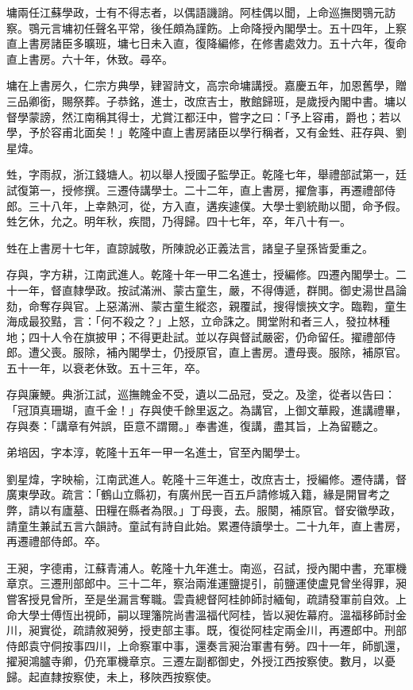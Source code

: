 \begin{pinyinscope}
墉兩任江蘇學政，士有不得志者，以偶語譏誚。阿桂偶以聞，上命巡撫閔鶚元訪察。鶚元言墉初任聲名平常，後任頗為謹飭。上命降授內閣學士。五十四年，上察直上書房諸臣多曠班，墉七日未入直，復降編修，在修書處效力。五十六年，復命直上書房。六十年，休致。尋卒。

墉在上書房久，仁宗方典學，肄習詩文，高宗命墉講授。嘉慶五年，加恩舊學，贈三品卿銜，賜祭葬。子恭銘，進士，改庶吉士，散館歸班，是歲授內閣中書。墉以督學蒙謗，然江南稱其得士，尤賞江都汪中，嘗字之曰：「予上容甫，爵也；若以學，予於容甫北面矣！」乾隆中直上書房諸臣以學行稱者，又有金甡、莊存與、劉星煒。

甡，字雨叔，浙江錢塘人。初以舉人授國子監學正。乾隆七年，舉禮部試第一，廷試復第一，授修撰。三遷侍講學士。二十二年，直上書房，擢詹事，再遷禮部侍郎。三十八年，上幸熱河，從，方入直，遘疾遽僕。大學士劉統勛以聞，命予假。甡乞休，允之。明年秋，疾間，乃得歸。四十七年，卒，年八十有一。

甡在上書房十七年，直諒誠敬，所陳說必正義法言，諸皇子皇孫皆愛重之。

存與，字方耕，江南武進人。乾隆十年一甲二名進士，授編修。四遷內閣學士。二十一年，督直隸學政。按試滿洲、蒙古童生，嚴，不得傳遞，群閧。御史湯世昌論劾，命奪存與官。上惡滿洲、蒙古童生縱恣，親覆試，搜得懷挾文字。臨鞫，童生海成最狡黠，言：「何不殺之？」上怒，立命誅之。閧堂附和者三人，發拉林種地；四十人令在旗披甲；不得更赴試。並以存與督試嚴密，仍命留任。擢禮部侍郎。遭父喪。服除，補內閣學士，仍授原官，直上書房。遭母喪。服除，補原官。五十一年，以衰老休致。五十三年，卒。

存與廉鯁。典浙江試，巡撫餽金不受，遺以二品冠，受之。及塗，從者以告曰：「冠頂真珊瑚，直千金！」存與使千餘里返之。為講官，上御文華殿，進講禮畢，存與奏：「講章有舛誤，臣意不謂爾。」奉書進，復講，盡其旨，上為留聽之。

弟培因，字本淳，乾隆十五年一甲一名進士，官至內閣學士。

劉星煒，字映榆，江南武進人。乾隆十三年進士，改庶吉士，授編修。遷侍講，督廣東學政。疏言：「鶴山立縣初，有廣州民一百五戶請修城入籍，緣是開冒考之弊，請以有廬墓、田糧在縣者為限。」丁母喪，去。服闋，補原官。督安徽學政，請童生兼試五言六韻詩。童試有詩自此始。累遷侍讀學士。二十九年，直上書房，再遷禮部侍郎。卒。

王昶，字德甫，江蘇青浦人。乾隆十九年進士。南巡，召試，授內閣中書，充軍機章京。三遷刑部郎中。三十二年，察治兩淮運鹽提引，前鹽運使盧見曾坐得罪，昶嘗客授見曾所，至是坐漏言奪職。雲貴總督阿桂帥師討緬甸，疏請發軍前自效。上命大學士傅恆出視師，嗣以理籓院尚書溫福代阿桂，皆以昶佐幕府。溫福移師討金川，昶實從，疏請敘昶勞，授吏部主事。既，復從阿桂定兩金川，再遷郎中。刑部侍郎袁守侗按事四川，上命察軍中事，還奏言昶治軍書有勞。四十一年，師凱還，擢昶鴻臚寺卿，仍充軍機章京。三遷左副都御史，外授江西按察使。數月，以憂歸。起直隸按察使，未上，移陜西按察使。


\end{pinyinscope}
